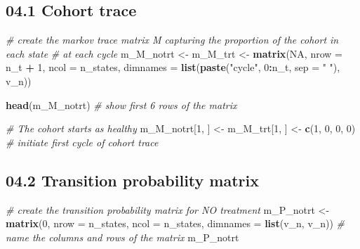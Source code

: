 \documentclass[]{article}
\newenvironment{Shaded}{\begin{snugshade}}{\end{snugshade}}
\newcommand{\KeywordTok}[1]{\textcolor[rgb]{0.13,0.29,0.53}{\textbf{#1}}}
\newcommand{\DataTypeTok}[1]{\textcolor[rgb]{0.13,0.29,0.53}{#1}}
\newcommand{\DecValTok}[1]{\textcolor[rgb]{0.00,0.00,0.81}{#1}}
\newcommand{\StringTok}[1]{\textcolor[rgb]{0.31,0.60,0.02}{#1}}
\newcommand{\CommentTok}[1]{\textcolor[rgb]{0.56,0.35,0.01}{\textit{#1}}}
\newcommand{\OtherTok}[1]{\textcolor[rgb]{0.56,0.35,0.01}{#1}}
\newcommand{\OperatorTok}[1]{\textcolor[rgb]{0.81,0.36,0.00}{\textbf{#1}}}
\newcommand{\NormalTok}[1]{#1}
\begin{document}
\subsection{04.1 Cohort trace}\label{cohort-trace}

\begin{Shaded}
\begin{Highlighting}[]
\CommentTok{# create the markov trace matrix M capturing the proportion of the cohort in each state }
\CommentTok{# at each cycle}
\NormalTok{m_M_notrt <-}\StringTok{ }\NormalTok{m_M_trt <-}\StringTok{ }\KeywordTok{matrix}\NormalTok{(}\OtherTok{NA}\NormalTok{, }
                               \DataTypeTok{nrow     =}\NormalTok{ n_t }\OperatorTok{+}\StringTok{ }\DecValTok{1}\NormalTok{, }\DataTypeTok{ncol =}\NormalTok{ n_states,}
                               \DataTypeTok{dimnames =} \KeywordTok{list}\NormalTok{(}\KeywordTok{paste}\NormalTok{(}\StringTok{"cycle"}\NormalTok{, }\DecValTok{0}\OperatorTok{:}\NormalTok{n_t, }\DataTypeTok{sep =} \StringTok{" "}\NormalTok{), v_n))}

\KeywordTok{head}\NormalTok{(m_M_notrt) }\CommentTok{# show first 6 rows of the matrix }

\CommentTok{# The cohort starts as healthy}
\NormalTok{m_M_notrt[}\DecValTok{1}\NormalTok{, ] <-}\StringTok{ }\NormalTok{m_M_trt[}\DecValTok{1}\NormalTok{, ] <-}\StringTok{ }\KeywordTok{c}\NormalTok{(}\DecValTok{1}\NormalTok{, }\DecValTok{0}\NormalTok{, }\DecValTok{0}\NormalTok{, }\DecValTok{0}\NormalTok{) }\CommentTok{# initiate first cycle of cohort trace }
\end{Highlighting}
\end{Shaded}

\subsection{04.2 Transition probability
matrix}\label{transition-probability-matrix}

\begin{Shaded}
\begin{Highlighting}[]
\CommentTok{# create the transition probability matrix for NO treatment}
\NormalTok{m_P_notrt  <-}\StringTok{ }\KeywordTok{matrix}\NormalTok{(}\DecValTok{0}\NormalTok{,}
                     \DataTypeTok{nrow =}\NormalTok{ n_states,}
                     \DataTypeTok{ncol =}\NormalTok{ n_states,}
                     \DataTypeTok{dimnames =} \KeywordTok{list}\NormalTok{(v_n, v_n)) }\CommentTok{# name the columns and rows of the matrix}
\NormalTok{m_P_notrt}
\end{Highlighting}
\end{Shaded}
\end{document}
